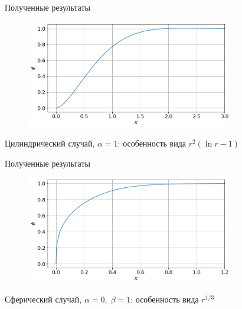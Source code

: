 \begin{frame}{Полученные результаты}
\vspace{-0.6cm}
\begin{figure}
	\includegraphics[width=0.81\textwidth]{figures/result_volumes_cyl_bi.png}
\end{figure}
\vspace{-0.7cm}
\begin{center}
	Цилиндрический случай, $\alpha = 1$: особенность вида $r^2 (\ln r - 1)$
\end{center}
\end{frame}


\begin{frame}{Полученные результаты}
\vspace{-0.6cm}
\begin{figure}
	\includegraphics[width=0.81\textwidth]{figures/result_volumes_sph_p.png}
\end{figure}
\vspace{-0.7cm}
\begin{center}
	Сферический случай, $\alpha = 0, \; \beta = 1$: особенность вида $r^{1/3}$
\end{center}
\end{frame}